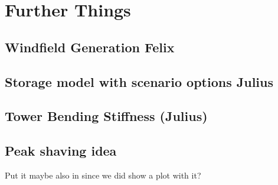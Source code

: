 \chapter{Further Things}
\section{Windfield Generation Felix}

\section{Storage model with scenario options Julius}

\section{Tower Bending Stiffness (Julius)}


\section{Peak shaving idea}
Put it maybe also in since we did show a plot with it?

